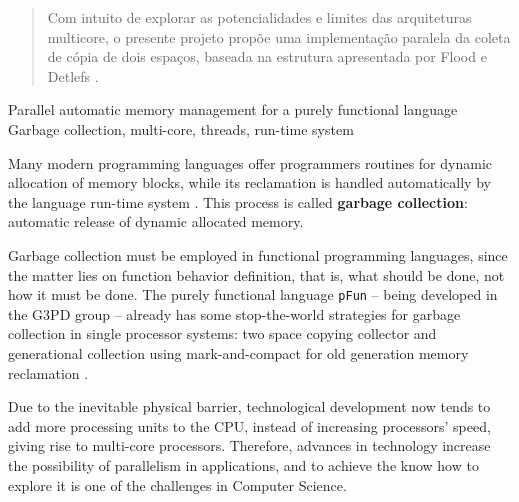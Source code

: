 \documentclass[ccc, pg2]{esinucpel}
\begin{document}
\begin{abstract}
Com intuito de explorar as potencialidades e limites das arquiteturas multicore, o presente projeto propõe uma implementação paralela da coleta de cópia de dois espaços, baseada na estrutura apresentada por Flood e Detlefs \cite{bib:flood:pargc}.


\end{abstract}

\begin{englishabstract}%
  {Parallel automatic memory management for a purely functional language}%
  {Garbage collection, multi-core, threads, run-time system}
  
Many modern programming languages offer programmers routines for dynamic allocation of memory blocks, while its reclamation is handled automatically by the language run-time system \cite{bib:lins:gc}. This process is called {\bf garbage collection}: automatic release of dynamic allocated memory.

Garbage collection must be employed in functional programming languages, since the matter lies on function behavior definition, that is, what should be done, not how it must be done. The purely functional language {\tt pFun} -- being developed in the G3PD group -- already has some stop-the-world strategies for garbage collection in single processor systems: two space copying collector \cite{bib:dubois:pfun} and generational collection using mark-and-compact for old generation memory reclamation \cite{bib:beloni}.


Due to the inevitable physical barrier, technological development now tends to add more processing units to the CPU, instead of increasing processors' speed, giving rise to multi-core processors. Therefore, advances in technology increase the possibility of parallelism in applications, and to achieve the know how to explore it is one of the challenges in Computer Science.


\end{englishabstract}
\end{document}
